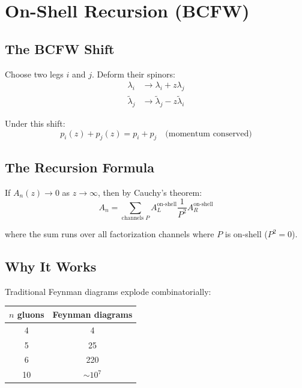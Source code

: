 
\chapter{On-Shell Recursion (BCFW)}
\label{ch:bcfw}

\section{The BCFW Shift}

Choose two legs $i$ and $j$. Deform their spinors:
\begin{align}
\lambda_i &\to \lambda_i + z \lambda_j \\
\tilde{\lambda}_j &\to \tilde{\lambda}_j - z \tilde{\lambda}_i
\end{align}

Under this shift:
\begin{equation}
p_i(z) + p_j(z) = p_i + p_j \quad \text{(momentum conserved)}
\end{equation}

\section{The Recursion Formula}

If $A_n(z) \to 0$ as $z \to \infty$, then by Cauchy's theorem:
\begin{equation}
\boxed{A_n = \sum_{\text{channels } P} A_L^{\text{on-shell}} \frac{1}{P^2} A_R^{\text{on-shell}}}
\end{equation}

where the sum runs over all factorization channels where $P$ is on-shell ($P^2 = 0$).

\section{Why It Works}

Traditional Feynman diagrams explode combinatorially:
\begin{center}
\begin{tabular}{|c|c|}
\hline
$n$ gluons & Feynman diagrams \\
\hline
4 & 4 \\
5 & 25 \\
6 & 220 \\
10 & $\sim 10^7$ \\
\hline
\end{tabular}
\end{center}

